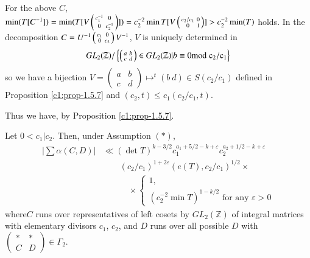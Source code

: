 For the above $C$, $\min(T[C^{-1}])=\min(T[V\left(\begin{smallmatrix}
    c^{-1}_{1} & 0\\ 0 & c^{-1}_{2}
  \end{smallmatrix}\right)])=c^{-2}_{2}\break\min
T[V\left(\begin{smallmatrix} c_{2}/c_{1} & 0\\ 0 & 1
  \end{smallmatrix}\right)]>c^{-2}_{2}\min(T)$ holds. In the
decomposition $C=U^{-1}\break\left(\begin{smallmatrix} c_{1} & 0\\ 0 & c_{2}
\end{smallmatrix}\right)V^{-1}$, $V$ is uniquely determined in
$$GL_{2}(\mathbb{Z})/\left\{\left(\begin{smallmatrix} a & b\\ c & d
\end{smallmatrix}\right)\in GL_{2}(\mathbb{Z})|b\equiv 0\rm{mod} \;
c_{2}/c_{1}\right\}$$ 
so we have a bijection
$V=\left(\begin{smallmatrix} a & b\\ c & d
\end{smallmatrix}\right)\mapsto^{t}(b\ d)\in S(c_{2}/c_{1})$ defined
in Proposition \ref{c1:prop-1.5.7} and $(c_{2},t)\leq
c_{1}(c_{2}/c_{1},t)$.

Thus we have, by Proposition \ref{c1:prop-1.5.7}.


\begin{sublemma}\label{c1:lem-1.5.11}
Let $0<c_{1}|c_{2}$. Then, under Assumption $(\ast)$,
\begin{align*}
|\sum \alpha (C,D)|&\ll (\det
T)^{k-3/2}c_{1}^{a_{1}+5/2-k + \varepsilon}
c_{2}^{a_{2}+1/2-k+\varepsilon}\\
&\qquad(c_{2}/c_{1})^{1+2\varepsilon}(e(T),c_{2}/c_{1})^{1/2}\times\\ 
&\qquad\quad\times
\begin{cases}
1,\\
(c^{-2}_{2}\min T)^{1-k/2}\text{ \ for any \ }\varepsilon>0
\end{cases}
\end{align*}
where\pageoriginale $C$ runs over representatives of left cosets by
$GL_{2}(\mathbb{Z})$ of integral matrices with elementary divisors
$c_{1}$, $c_{2}$, and $D$ runs over all possible $D$ with
$\left(\begin{smallmatrix} \ast & \ast\\ C & D
\end{smallmatrix}\right)\in\Gamma_{2}$.
\end{sublemma}

